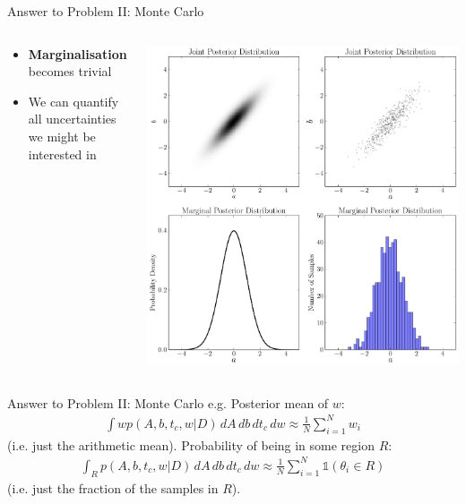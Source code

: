 \begin{frame}[t]{Answer to Problem II: Monte Carlo}
\begin{columns}[T]
\begin{column}{0.35\textwidth}
  \vspace{20pt}
  \begin{itemize}
  \setlength{\itemsep}{10pt}
  \item {\bf Marginalisation} becomes trivial
  \item We can quantify all uncertainties we might be interested in
  \end{itemize}
\end{column}
\hfill
\begin{column}{0.5\textwidth}
  \hspace{-30pt}
  \includegraphics[scale=0.22]{marginalisation.pdf}
\end{column}

\end{columns}
\end{frame}



\begin{frame}[t]{Answer to Problem II: Monte Carlo}
e.g. Posterior mean of $w$:
\begin{eqnarray}
\int w p(A, b, t_c, w | D) \, dA \, db \, dt_c \, dw
\approx \frac{1}{N}\sum_{i=1}^N w_i
\end{eqnarray}
(i.e. just the arithmetic mean). Probability of being in some region $R$:
\begin{eqnarray}
\int_R p(A, b, t_c, w | D) \, dA \, db \, dt_c \, dw
\approx \frac{1}{N}\sum_{i=1}^N \mathds{1}\left(\theta_i \in R \right)
\end{eqnarray}
(i.e. just the fraction of the samples in $R$).
\end{frame}


